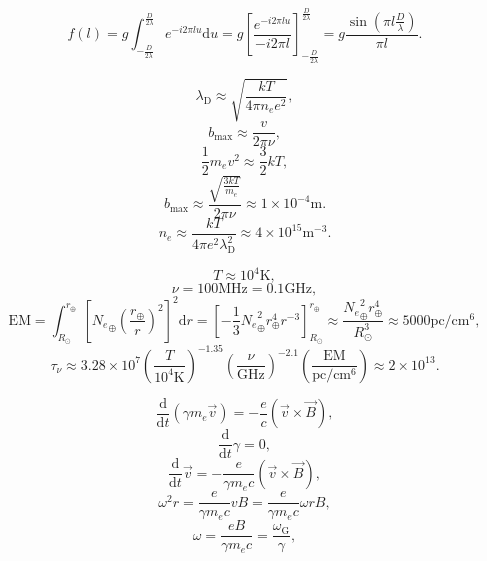 \documentclass[12pt]{ctexart}
\def\d{\mathrm{d}}
\begin{document}
\begin{equation*}
    f(l)
    =g\int_{-\frac{D}{2\lambda}}^{\frac{D}{2\lambda}}
    e^{-i2\pi lu}\d u
    =g\left[\frac{e^{-i2\pi lu}}{-i2\pi l}\right]_{-\frac{D}{2\lambda}}^{\frac{D}{2\lambda}}
    =g\frac{\sin(\pi l\frac{D}{\lambda})}{\pi l}.
\end{equation*}

\begin{equation*}
    \lambda_\text{D}\approx\sqrt{\frac{kT}{4\pi n_e e^2}},
\end{equation*}
\begin{equation*}
    b_\text{max}\approx\frac{v}{2\pi\nu},
\end{equation*}
\begin{equation*}
    \frac{1}{2}m_ev^2\approx\frac{3}{2}kT,
\end{equation*}
\begin{equation*}
    b_\text{max}\approx\frac{\sqrt{\frac{3kT}{m_e}}}{2\pi\nu}\approx1\times10^{-4}\text{m}.
\end{equation*}
\begin{equation*}
    n_e\approx\frac{kT}{4\pi e^2\lambda_\text{D}^2}\approx4\times10^{15}\text{m}^{-3}.
\end{equation*}

\begin{equation*}
    T\approx10^{4}\text{K},
\end{equation*}
\begin{equation*}
    \nu=100\text{MHz}=0.1\text{GHz},
\end{equation*}
\begin{equation*}
    \text{EM}
    =\int^{r_\oplus}_{R_\odot} \left[{N_e}_\oplus\left(\frac{r_\oplus}{r}\right)^2\right]^2\d r
    =\left[-\frac{1}{3}{N_e}_\oplus^2 r_\oplus^4r^{-3}\right]^{r_\oplus}_{R_\odot}
    \approx\frac{{N_e}_\oplus^2 r_\oplus^4}{R_\odot^3}
    \approx5000\text{pc}/\text{cm}^6,
\end{equation*}
\begin{equation*}
    \tau_\nu\approx3.28\times10^7
    \left(\frac{T}{10^4\text{K}}\right)^{-1.35}
    \left(\frac{\nu}{\text{GHz}}\right)^{-2.1}
    \left(\frac{\text{EM}}{\text{pc}/\text{cm}^6}\right)
    \approx2\times10^{13}.
\end{equation*}

\begin{equation*}
    \frac{\d}{\d t}(\gamma m_e\vec{v})=-\frac{e}{c}(\vec{v}\times\vec{B}),
\end{equation*}
\begin{equation*}
    \frac{\d}{\d t}\gamma=0,
\end{equation*}
\begin{equation*}
    \frac{\d}{\d t}\vec{v}=-\frac{e}{\gamma m_ec}(\vec{v}\times\vec{B}),
\end{equation*}
\begin{equation*}
    \omega^2r=\frac{e}{\gamma m_ec}vB=\frac{e}{\gamma m_ec}\omega rB,
\end{equation*}
\begin{equation*}
    \omega=\frac{eB}{\gamma m_ec}=\frac{\omega_\text{G}}{\gamma},
\end{equation*}
\end{document}
